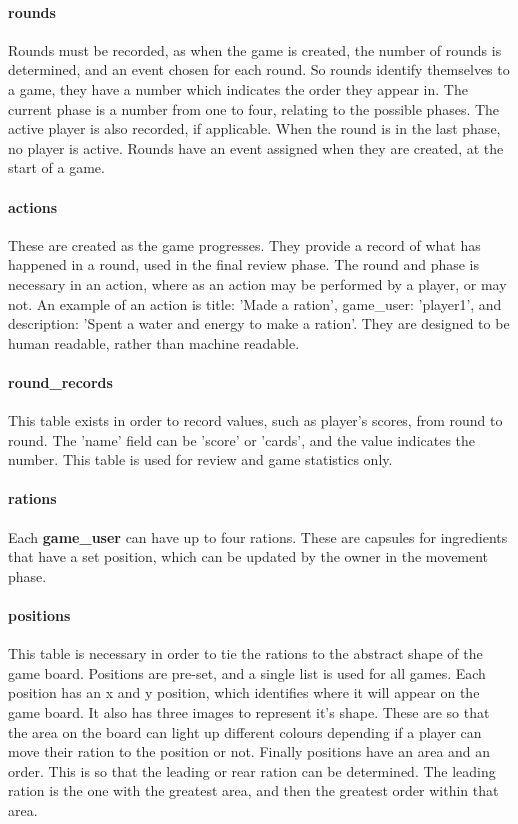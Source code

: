\paragraph{rounds} Rounds must be recorded, as when the game is created, the number of rounds is determined, and an event chosen for each round. So rounds identify themselves to a game, they have a number which indicates the order they appear in. The current phase is a number from one to four, relating to the possible phases. The active player is also recorded, if applicable. When the round is in the last phase, no player is active. Rounds have an event assigned when they are created, at the start of a game.

\paragraph{actions} These are created as the game progresses. They provide a record of what has happened in a round, used in the final review phase. The round and phase is necessary in an action, where as an action may be performed by a player, or may not. An example of an action is title: 'Made a ration', game\_user: 'player1', and description: 'Spent a water and energy to make a ration'. They are designed to be human readable, rather than machine readable.

\paragraph{round\_records} This table exists in order to record values, such as player's scores, from round to round. The 'name' field can be 'score' or 'cards', and the value indicates the number. This table is used for review and game statistics only.

\paragraph{rations} Each \textbf{game\_user} can have up to four rations. These are capsules for ingredients that have a set position, which can be updated by the owner in the movement phase.

\paragraph{positions} This table is necessary in order to tie the rations to the abstract shape of the game board. Positions are pre-set, and a single list is used for all games. Each position has an x and y position, which identifies where it will appear on the game board. It also has three images to represent it's shape. These are so that the area on the board can light up different colours depending if a player can move their ration to the position or not. Finally positions have an area and an order. This is so that the leading or rear ration can be determined. The leading ration is the one with the greatest area, and then the greatest order within that area.

